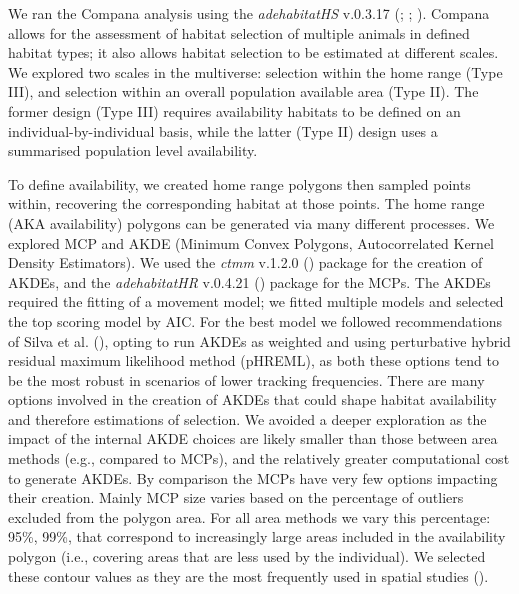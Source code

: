 \documentclass[10pt,a4paper]{article}
\begin{document}
We ran the Compana analysis using the \emph{adehabitatHS} v.0.3.17 (; ; ).
Compana allows for the assessment of habitat selection of multiple animals in defined habitat types; it also allows habitat selection to be estimated at different scales.
We explored two scales in the multiverse: selection within the home range (Type III), and selection within an overall population available area (Type II).
The former design (Type III) requires availability habitats to be defined on an individual-by-individual basis, while the latter (Type II) design uses a summarised population level availability.

To define availability, we created home range polygons then sampled points within, recovering the corresponding habitat at those points.
The home range (AKA availability) polygons can be generated via many different processes.
We explored MCP and AKDE (Minimum Convex Polygons, Autocorrelated Kernel Density Estimators).
We used the \emph{ctmm} v.1.2.0 () package for the creation of AKDEs, and the \emph{adehabitatHR} v.0.4.21 () package for the MCPs.
The AKDEs required the fitting of a movement model; we fitted multiple models and selected the top scoring model by AIC.
For the best model we followed recommendations of Silva et al. (), opting to run AKDEs as weighted and using perturbative hybrid residual maximum likelihood method (pHREML), as both these options tend to be the most robust in scenarios of lower tracking frequencies.
There are many options involved in the creation of AKDEs that could shape habitat availability and therefore estimations of selection.
We avoided a deeper exploration as the impact of the internal AKDE choices are likely smaller than those between area methods (e.g., compared to MCPs), and the relatively greater computational cost to generate AKDEs.
By comparison the MCPs have very few options impacting their creation.
Mainly MCP size varies based on the percentage of outliers excluded from the polygon area.
For all area methods we vary this percentage: 95\%, 99\%, that correspond to increasingly large areas included in the availability polygon (i.e., covering areas that are less used by the individual).
We selected these contour values as they are the most frequently used in spatial studies ().
\end{document}
